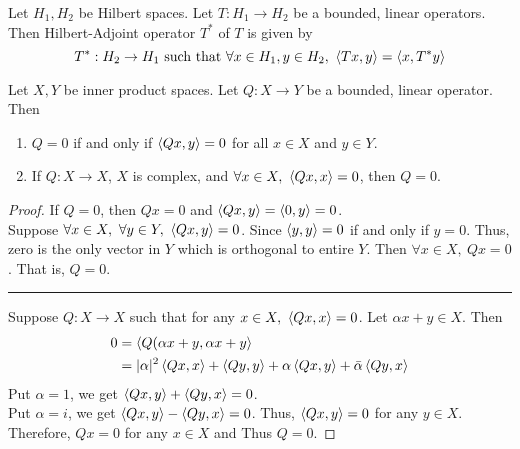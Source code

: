 \begin{definition}
	Let $H_1,H_2$ be Hilbert spaces.
	Let $T : H_1 \to H_2$ be a bounded, linear operators.
	Then Hilbert-Adjoint operator $T^\ast$ of $T$ is given by
	\[ T^\ast : H_2 \to H_1 \text{ such that } \forall x \in H_1,y \in H_2,\  \left\langle Tx,y \right\rangle = \left\langle x,T^\ast y \right\rangle \]
\end{definition}

\begin{lemma}
	Let $X,Y$ be inner product spaces.
	Let $Q : X \to Y$ be a bounded, linear operator.
	Then
	\begin{enumerate}
		\item $Q = 0$ if and only if $\left\langle Qx,y \right\rangle = 0$ for all $x \in X$ and $y \in Y$.
		\item If $Q : X \to X$, $X$ is complex, and $\forall x \in X,\ \inner{Qx}{x}= 0$, then $Q = 0$.
	\end{enumerate}
\end{lemma}
\begin{proof}
	If $Q = 0$, then $Qx = 0$ and $\left\langle Qx,y \right\rangle = \left\langle 0,y \right\rangle = 0$.\\

	Suppose $\forall x \in X,\ \forall y \in Y,\ \inner{Qx}{y} = 0$.
	Since $\left\langle y,y \right\rangle = 0$ if and only if $y = 0$.
	Thus, zero is the only vector in $Y$ which is orthogonal to entire $Y$.
	Then $\forall x \in X,\ Qx = 0$.
	That is, $Q = 0$.\\

	\hrule \vspace{1em}

	Suppose $Q : X \to X$ such that for any $x \in X,\ \left\langle Qx,x \right\rangle = 0$.
	Let $\alpha x + y \in X$.
	Then
	\begin{align*}
		0 & = \left\langle Q(\alpha x + y,\alpha x + y \right\rangle\\
		& = |\alpha|^2 \left\langle Qx,x \right\rangle + \left\langle Qy,y \right\rangle + \alpha \left\langle Qx,y \right\rangle + \bar{\alpha}\left\langle Qy,x \right\rangle
	\end{align*}
	Put $\alpha = 1$, we get $\left\langle Qx,y \right\rangle + \left\langle Qy,x \right\rangle = 0$.\\
	Put $\alpha = i$, we get $\left\langle Qx,y \right\rangle - \left\langle Qy,x \right\rangle = 0$.
	Thus, $\left\langle Qx,y \right\rangle = 0$ for any $y \in X$.
	Therefore, $Qx = 0$ for any $x \in X$ and Thus $Q = 0$.
\end{proof}

